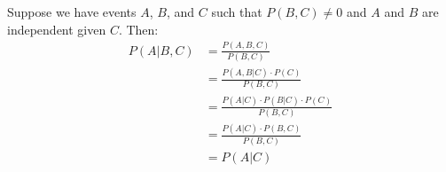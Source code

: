 \documentclass{article}
\begin{document}
\clearpage
\problem{}
Suppose we have events $A$, $B$, and $C$ such that $P(B, C) \neq 0$ and $A$ and $B$ are independent given $C$. Then:
\begin{align*}
    P(A | B, C) & = \frac{P(A, B, C)}{P(B, C)} \\
    & = \frac{P(A, B | C) \cdot P(C)}{P(B, C)} \\
    & = \frac{P(A | C) \cdot P(B | C) \cdot P(C)}{P(B, C)} \\
    & = \frac{P(A | C) \cdot P(B, C)}{P(B, C)} \\
    & = P(A | C)
\end{align*}
\end{document}
